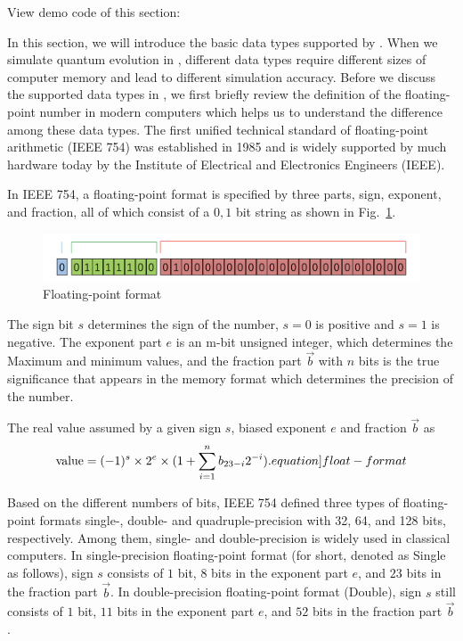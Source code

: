 View demo code of this section: 

In this section, we will introduce the basic data types supported by \MindQuantum. When we simulate quantum evolution in \MindQuantum, different data types require different sizes of computer memory and lead to different simulation accuracy.
Before we discuss the supported data types in \MindQuantum, we first briefly review the definition of the floating-point number in modern computers which helps us to understand the difference among these data types.
The first unified technical standard of floating-point arithmetic (IEEE 754) \cite{8766229} was established in 1985 and is widely supported by much hardware today by the Institute of Electrical and Electronics Engineers (IEEE).

In IEEE 754, a floating-point format is specified by three parts, sign, exponent, and fraction, all of which consist of a ${0,1}$ bit string as shown in Fig.~\ref{fig:ieee}.

\begin{figure}[h]
    \centering
    \includegraphics[width=\linewidth]{2.1_figures/ieee.png}
    \caption{Floating-point format}
    \label{fig:ieee}
\end{figure}

The sign bit $s$ determines the sign of the number, $s=0$ is positive and $s=1$ is negative.
The exponent part $e$ is an m-bit unsigned integer, which determines the Maximum and minimum values, and the fraction part $\vec{b}$ with $n$ bits is the true significance that appears in the memory format which determines the precision of the number.

The real value assumed by a given sign $s$, biased exponent $e$ and fraction $\vec{b}$ as
\begin{equation}
    \mathrm{value} = (-1)^{s}\times 2^{e}\times (1+\sum_{i=1}^nb_{23-i}2^{-i}).
\label[equation]{float-format}
\end{equation}

Based on the different numbers of bits, IEEE 754 defined three types of floating-point formats single-, double- and quadruple-precision with 32, 64, and 128 bits, respectively.
Among them, single- and double-precision is widely used in classical computers.
In single-precision floating-point format (for short, denoted as Single as follows), sign $s$ consists of $1$ bit, $8$ bits in the exponent part $e$, and $23$ bits in the fraction part $\vec{b}$.
In double-precision floating-point format (Double), sign $s$ still consists of $1$ bit, $11$ bits in the exponent part $e$, and $52$ bits in the fraction part $\vec{b}$.

